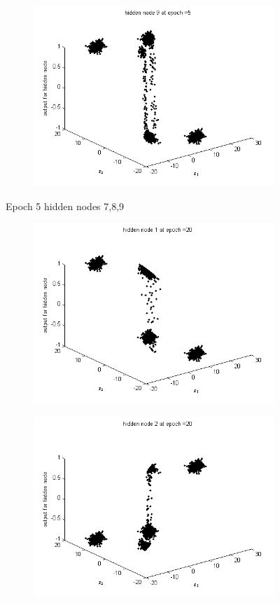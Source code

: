 \documentclass{article}
\begin{document}
\begin{flushleft}
\begin{figure}
\begin{subfigure}{.3\textwidth}
\end{subfigure}
\begin{subfigure}{.3\textwidth}
  \centering
  \includegraphics[width=.8\linewidth]{Classification/linearlySeparable/h5_9}
  
\end{subfigure}
\caption{Epoch 5 hidden nodes 7,8,9}
\end{figure}
\newpage
\begin{figure}
\begin{subfigure}{.3\textwidth}
  \centering
  \includegraphics[width=.8\linewidth]{Classification/linearlySeparable/h20_1}
 
\end{subfigure}%
\begin{subfigure}{.3\textwidth}
  \centering
  \includegraphics[width=.8\linewidth]{Classification/linearlySeparable/h20_2}
  

\end{subfigure}
\end{figure}
\end{flushleft}
\end{document}
